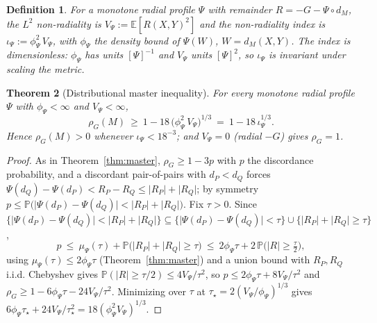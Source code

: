 \documentclass[11pt]{article}
\newtheorem{theorem}{Theorem}
\newtheorem{definition}[theorem]{Definition}
\theoremstyle{remark}
\newcommand{\Rem}{R}
\newcommand{\dM}{d_M}
\newcommand{\rhoG}{\rho_G}
\begin{document}
\begin{definition}
For a monotone radial profile $\Psi$ with remainder $\Rem=-G-\Psi\circ\dM$, the \emph{$L^2$
non-radiality} is $V_\Psi:=\mathbb E[\Rem(X,Y)^2]$ and the \emph{non-radiality index} is
$\iota_\Psi:=\phi_\Psi^2\,V_\Psi$, with $\phi_\Psi$ the density bound of $\Psi(W)$,
$W=\dM(X,Y)$. The index is dimensionless: $\phi_\Psi$ has units $[\Psi]^{-1}$ and $V_\Psi$
units $[\Psi]^2$, so $\iota_\Psi$ is invariant under scaling the metric.
\end{definition}

\begin{theorem}[Distributional master inequality]\label{thm:dist}
For every monotone radial profile $\Psi$ with $\phi_\Psi<\infty$ and $V_\Psi<\infty$,
\[
\rhoG(M)\ \ge\ 1-18\,\bigl(\phi_\Psi^2\,V_\Psi\bigr)^{1/3}\ =\ 1-18\,\iota_\Psi^{1/3}.
\]
Hence $\rhoG(M)>0$ whenever $\iota_\Psi<18^{-3}$; and $V_\Psi=0$ (radial $-G$) gives
$\rhoG=1$.
\end{theorem}

\begin{proof}
As in Theorem~\ref{thm:master}, $\rhoG\ge1-3p$ with $p$ the discordance probability, and a
discordant pair-of-pairs with $d_P<d_Q$ forces
$\Psi(d_Q)-\Psi(d_P)<\Rem_P-\Rem_Q\le\lvert\Rem_P\rvert+\lvert\Rem_Q\rvert$; by symmetry
$p\le\mathbb P\bigl(\lvert\Psi(d_P)-\Psi(d_Q)\rvert<\lvert\Rem_P\rvert+\lvert\Rem_Q\rvert\bigr)$.
Fix $\tau>0$. Since
$\{\lvert\Psi(d_P)-\Psi(d_Q)\rvert<\lvert\Rem_P\rvert+\lvert\Rem_Q\rvert\}
\subseteq\{\lvert\Psi(d_P)-\Psi(d_Q)\rvert<\tau\}\cup\{\lvert\Rem_P\rvert+\lvert\Rem_Q\rvert\ge\tau\}$,
\[
p\ \le\ \mu_\Psi(\tau)+\mathbb P\bigl(\lvert\Rem_P\rvert+\lvert\Rem_Q\rvert\ge\tau\bigr)
\ \le\ 2\phi_\Psi\tau+2\,\mathbb P\bigl(\lvert\Rem\rvert\ge\tfrac\tau2\bigr),
\]
using $\mu_\Psi(\tau)\le2\phi_\Psi\tau$ (Theorem~\ref{thm:master}) and a union bound with
$\Rem_P,\Rem_Q$ i.i.d. Chebyshev gives
$\mathbb P(\lvert\Rem\rvert\ge\tau/2)\le4V_\Psi/\tau^2$, so
$p\le2\phi_\Psi\tau+8V_\Psi/\tau^2$ and $\rhoG\ge1-6\phi_\Psi\tau-24V_\Psi/\tau^2$.
Minimizing over $\tau$ at $\tau_\star=2(V_\Psi/\phi_\Psi)^{1/3}$ gives
$6\phi_\Psi\tau_\star+24V_\Psi/\tau_\star^2=18(\phi_\Psi^2V_\Psi)^{1/3}$.
\end{proof}
\end{document}

